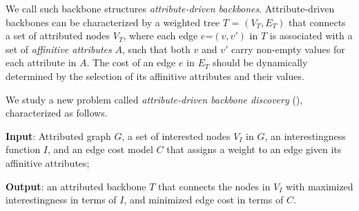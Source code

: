 \vspace{.5ex}
We call such backbone structures
{\em attribute-driven backbones}.
Attribute-driven backbones 
can be characterized by
a weighted tree $T$ = $(V_T, E_T)$ that connects a set of attributed nodes $V_T$,
where
each edge $e$=$(v, v')$ in $T$
is associated with a set of {\em affinitive attributes} $A$, such that both $v$ and $v'$ 
carry non-empty values
for each attribute in $A$.
The cost of an edge
$e$ in $E_T$ should be dynamically determined by
the selection of its affinitive attributes
and their values. 



\vspace{.5ex}
We study a new problem called
{\em attribute-driven backbone discovery} (\abd),
characterized as follows.
\tbi
\item \textbf{Input}: Attributed graph $G$, a set of interested nodes $V_I$ in $G$,
an interestingness function $I$, and an edge cost model $C$ that assigns a weight
to an edge given its affinitive attributes;
\item \textbf{Output}: an attributed backbone $T$ that connects
the nodes in $V_I$ with maximized interestingness in terms of $I$, and
minimized edge cost in terms of $C$.
\ei

